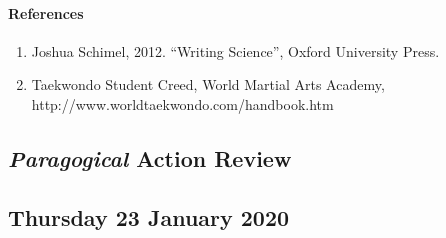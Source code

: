 \hypertarget{references}{%
\paragraph{References}\label{references}}

\begin{enumerate}
\def\labelenumi{\arabic{enumi}.}
\tightlist
\item
  Joshua Schimel, 2012. ``Writing Science'', Oxford University Press.
\item
  Taekwondo Student Creed, World Martial Arts Academy,
  http://www.worldtaekwondo.com/handbook.htm
\end{enumerate}

\hypertarget{paragogical-action-review}{%
\subsection{\texorpdfstring{\emph{Paragogical} Action
Review}{Paragogical Action Review}}\label{paragogical-action-review}}

\hypertarget{thursday-23-january-2020}{%
\subsection{Thursday 23 January
2020}\label{thursday-23-january-2020}}

